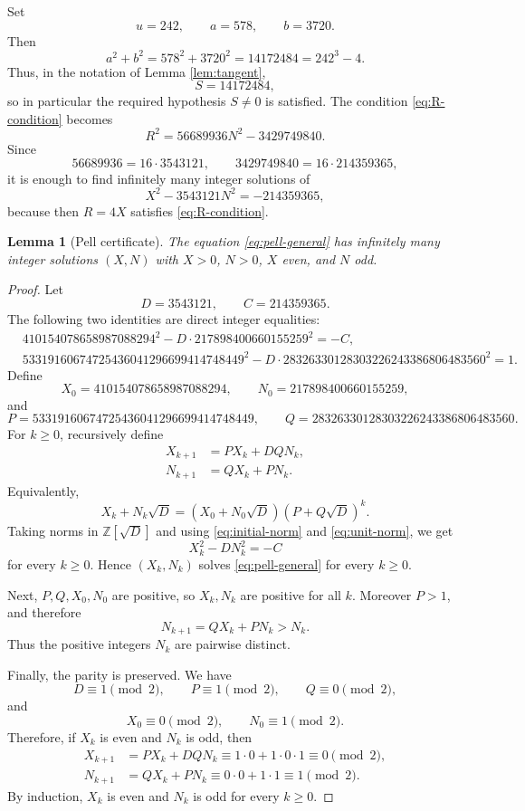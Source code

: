 \documentclass[11pt]{article}
\newtheorem{lemma}[theorem]{Lemma}
\theoremstyle{remark}
\begin{document}
Set
\[
        u=242,\qquad a=578,
        \qquad b=3720.
\]
Then
\[
        a^2+b^2=578^2+3720^2=14172484=242^3-4.
\]
Thus, in the notation of Lemma \ref{lem:tangent},
\[
        S=14172484,
\]
so in particular the required hypothesis \(S\neq0\) is satisfied.
The condition \eqref{eq:R-condition} becomes
\[
        R^2=56689936N^2-3429749840.
\]
Since
\[
        56689936=16\cdot 3543121,
        \qquad
        3429749840=16\cdot 214359365,
\]
it is enough to find infinitely many integer solutions of
\[
        X^2-3543121N^2=-214359365,           \tag{3}\label{eq:pell-general}
\]
because then \(R=4X\) satisfies \eqref{eq:R-condition}.

\begin{lemma}[Pell certificate]\label{lem:pell-certificate}
The equation \eqref{eq:pell-general} has infinitely many integer solutions
\((X,N)\) with \(X>0\), \(N>0\), \(X\) even, and \(N\) odd.
\end{lemma}

\begin{proof}
Let
\[
        D=3543121,
        \qquad
        C=214359365.
\]
The following two identities are direct integer equalities:
\begin{align}
&410154078658987088294^2
        -D\cdot 217898400660155259^2=-C,          \tag{4}\label{eq:initial-norm}\\
&53319160674725436041296699414748449^2
        -D\cdot 28326330128303226243386806483560^2=1.       \tag{5}\label{eq:unit-norm}
\end{align}
Define
\[
        X_0=410154078658987088294,
        \qquad
        N_0=217898400660155259,
\]
and
\[
        P=53319160674725436041296699414748449,
        \qquad
        Q=28326330128303226243386806483560.
\]
For \(k\geq 0\), recursively define
\begin{align*}
        X_{k+1}&=PX_k+DQN_k,\\
        N_{k+1}&=QX_k+PN_k.
\end{align*}
Equivalently,
\[
        X_k+N_k\sqrt D=(X_0+N_0\sqrt D)(P+Q\sqrt D)^k.
\]
Taking norms in \(\mathbb Z[\sqrt D]\) and using
\eqref{eq:initial-norm} and \eqref{eq:unit-norm}, we get
\[
        X_k^2-DN_k^2=-C
\]
for every \(k\geq 0\).  Hence \((X_k,N_k)\) solves
\eqref{eq:pell-general} for every \(k\geq 0\).

Next, \(P,Q,X_0,N_0\) are positive, so \(X_k,N_k\) are positive for all
\(k\).  Moreover \(P>1\), and therefore
\[
        N_{k+1}=QX_k+PN_k>N_k.
\]
Thus the positive integers \(N_k\) are pairwise distinct.

Finally, the parity is preserved.  We have
\[
        D\equiv 1\pmod 2,
        \qquad
        P\equiv 1\pmod 2,
        \qquad
        Q\equiv 0\pmod 2,
\]
and
\[
        X_0\equiv 0\pmod 2,
        \qquad
        N_0\equiv 1\pmod 2.
\]
Therefore, if \(X_k\) is even and \(N_k\) is odd, then
\begin{align*}
        X_{k+1}&=PX_k+DQN_k\equiv 1\cdot0+1\cdot0\cdot1\equiv0\pmod2,\\
        N_{k+1}&=QX_k+PN_k\equiv0\cdot0+1\cdot1\equiv1\pmod2.
\end{align*}
By induction, \(X_k\) is even and \(N_k\) is odd for every \(k\geq0\).
\end{proof}
\end{document}
